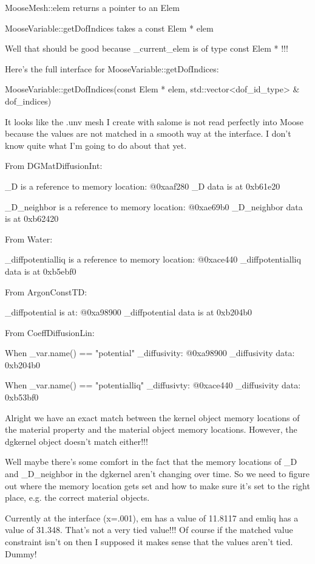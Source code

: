 {MooseMesh::elem returns a pointer to an Elem

MooseVariable::getDofIndices takes a const Elem * elem

Well that should be good because _current_elem is of type const Elem * !!!

Here's the full interface for MooseVariable::getDofIndices:

MooseVariable::getDofIndices(const Elem * elem, std::vector<dof_id_type> & dof_indices)

It looks like the .unv mesh I create with salome is not read perfectly into Moose because the values are not matched in a smooth way at the interface. I don't know quite what I'm going to do about that yet.

From DGMatDiffusionInt:

_D is a reference to memory location: @0xaaf280
_D data is at 0xb61e20

_D_neighbor is a reference to memory location: @0xae69b0
_D_neighbor data is at 0xb62420

From Water:

_diffpotentialliq is a reference to memory location: @0xace440
_diffpotentialliq data is at 0xb5ebf0

From ArgonConstTD:

_diffpotential is at: @0xa98900
_diffpotential data is at 0xb204b0

From CoeffDiffusionLin:

When _var.name() == "potential"
_diffusivity: @0xa98900
_diffusivity data: 0xb204b0

When _var.name() == "potentialliq"
_diffusivty: @0xace440
_diffusivity data: 0xb53bf0

Alright we have an exact match between the kernel object memory locations of the material property and the material object memory locations. However, the dgkernel object doesn't match either!!!

Well maybe there's some comfort in the fact that the memory locations of _D and _D_neighbor in the dgkernel aren't changing over time. So we need to figure out where the memory location gets set and how to make sure it's set to the right place, e.g. the correct material objects.

Currently at the interface (x=.001), em has a value of 11.8117 and emliq has a value of 31.348. That's not a very tied value!!! Of course if the matched value constraint isn't on then I supposed it makes sense that the values aren't tied. Dummy!

}
